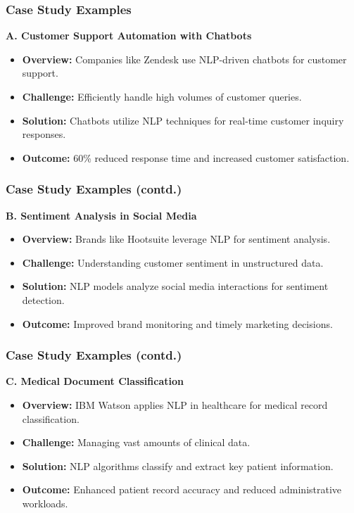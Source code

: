\documentclass[aspectratio=169]{beamer}
\begin{document}
\begin{frame}
    \frametitle{Case Study Examples}
    \textbf{A. Customer Support Automation with Chatbots}
    \begin{itemize}
        \item \textbf{Overview:} Companies like Zendesk use NLP-driven chatbots for customer support.
        \item \textbf{Challenge:} Efficiently handle high volumes of customer queries.
        \item \textbf{Solution:} Chatbots utilize NLP techniques for real-time customer inquiry responses.
        \item \textbf{Outcome:} 60\% reduced response time and increased customer satisfaction.
    \end{itemize}
\end{frame}

\begin{frame}
    \frametitle{Case Study Examples (contd.)}
    \textbf{B. Sentiment Analysis in Social Media}
    \begin{itemize}
        \item \textbf{Overview:} Brands like Hootsuite leverage NLP for sentiment analysis.
        \item \textbf{Challenge:} Understanding customer sentiment in unstructured data.
        \item \textbf{Solution:} NLP models analyze social media interactions for sentiment detection.
        \item \textbf{Outcome:} Improved brand monitoring and timely marketing decisions.
    \end{itemize}
\end{frame}

\begin{frame}
    \frametitle{Case Study Examples (contd.)}
    \textbf{C. Medical Document Classification}
    \begin{itemize}
        \item \textbf{Overview:} IBM Watson applies NLP in healthcare for medical record classification.
        \item \textbf{Challenge:} Managing vast amounts of clinical data.
        \item \textbf{Solution:} NLP algorithms classify and extract key patient information.
        \item \textbf{Outcome:} Enhanced patient record accuracy and reduced administrative workloads.
    \end{itemize}
\end{frame}
\end{document}
